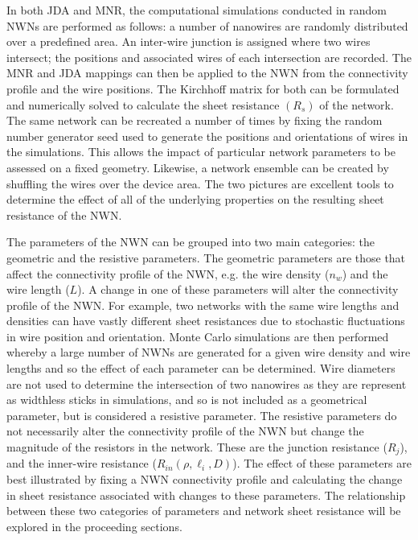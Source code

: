 In both JDA and MNR, the computational simulations conducted in random NWNs are performed as follows: a number of nanowires are randomly distributed over a predefined area. An inter-wire junction is assigned where two wires intersect; the positions and associated wires of each intersection are recorded. The MNR and JDA mappings can then be applied to the NWN from the connectivity profile and the wire positions. The Kirchhoff matrix for both can be formulated and numerically solved to calculate the sheet resistance $(R_s)$ of the network. The same network can be recreated a number of times by fixing the random number generator seed used to generate the positions and orientations of wires in the simulations. This allows the impact of particular network parameters to be assessed on a fixed geometry. Likewise, a network ensemble can be created by shuffling the wires over the device area. The two pictures are excellent tools to determine the effect of all of the underlying properties on the resulting sheet resistance of the NWN. 

The parameters of the NWN can be grouped into two main categories: the geometric and the resistive parameters. The geometric parameters are those that affect the connectivity profile of the NWN, e.g. the wire density ($n_w$) and the wire length ($L$). A change in one of these parameters will alter the connectivity profile of the NWN. For example, two networks with the same wire lengths and densities can have vastly different sheet resistances due to stochastic fluctuations in wire position and orientation. Monte Carlo simulations are then performed whereby a large number of NWNs are generated for a given wire density and wire lengths and so the effect of each parameter can be determined. Wire diameters are not used to determine the intersection of two nanowires as they are represent as widthless sticks in simulations, and so is not included as a geometrical parameter, but is considered a resistive parameter. The resistive parameters do not necessarily alter the connectivity profile of the NWN but change the magnitude of the resistors in the network. These are the junction resistance ($R_j$), and the inner-wire resistance ($R_{in}(\rho,\ell_i,D)$). The effect of these parameters are best illustrated by fixing a NWN connectivity profile and calculating the change in sheet resistance associated with changes to these parameters. The relationship between these two categories of parameters and network sheet resistance will be explored in the proceeding sections. 

